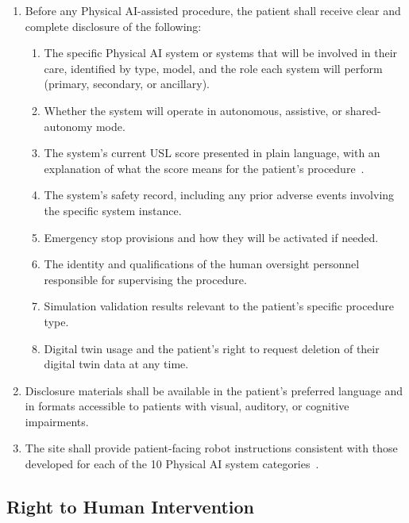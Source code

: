 \begin{enumerate}[label=(\alph*)]
\item Before any Physical AI-assisted procedure, the patient shall receive clear
  and complete disclosure of the following:
  \begin{enumerate}[label=(\arabic*)]
  \item The specific Physical AI system or systems that will be involved in
    their care, identified by type, model, and the role each system will
    perform (primary, secondary, or ancillary).
  \item Whether the system will operate in autonomous, assistive, or
    shared-autonomy mode.
  \item The system's current USL score presented in plain language, with an
    explanation of what the score means for the patient's
    procedure~\cite{usl2026}.
  \item The system's safety record, including any prior adverse events involving
    the specific system instance.
  \item Emergency stop provisions and how they will be activated if needed.
  \item The identity and qualifications of the human oversight personnel
    responsible for supervising the procedure.
  \item Simulation validation results relevant to the patient's specific
    procedure type.
  \item Digital twin usage and the patient's right to request deletion of their
    digital twin data at any time.
  \end{enumerate}

\item Disclosure materials shall be available in the patient's preferred
  language and in formats accessible to patients with visual, auditory, or
  cognitive impairments.

\item The site shall provide patient-facing robot instructions consistent with
  those developed for each of the 10 Physical AI system
  categories~\cite{patientinstructions2026}.
\end{enumerate}

\subsection{Right to Human Intervention}


